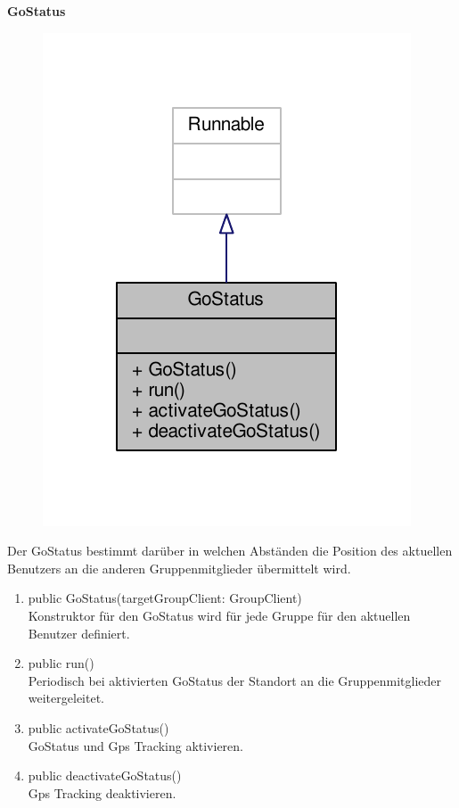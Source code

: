 \textbf{GoStatus}
\begin{figure}[H]
	\includegraphics[scale = 1]{res/umlClasses/go_status__coll__graph.pdf}
	\centering
\end{figure}
Der GoStatus bestimmt darüber in welchen Abständen die Position des aktuellen Benutzers an die anderen Gruppenmitglieder übermittelt wird.
\begin{enumerate}
	\item public GoStatus(targetGroupClient: GroupClient)\\
		Konstruktor für den GoStatus wird für jede Gruppe für den aktuellen Benutzer definiert.
	\item public run()\\
		Periodisch bei aktivierten GoStatus der Standort an die Gruppenmitglieder weitergeleitet.
	\item public activateGoStatus()\\
		GoStatus und Gps Tracking aktivieren.
	\item public deactivateGoStatus()\\
		Gps Tracking deaktivieren.
\end{enumerate}


